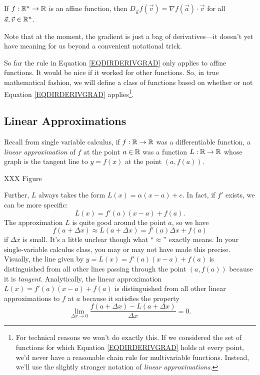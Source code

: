 \begin{theorem}
	\label{THMAFFINEDERIV}
	If $f:\mathbb{R}^n\to\mathbb{R}$ is an affine function, then
	$
		D_{\vec a}f(\vec v) = \nabla f(\vec a)\cdot \vec v
	$
	for all $\vec a,\vec v\in\mathbb{R}^n$.
\end{theorem}

Note that at the moment, the gradient is just a bag of derivatives---it
doesn't yet have meaning for us beyond a convenient notational trick.

So far the rule in Equation \eqref{EQDIRDERIVGRAD} only applies to affine functions.
It would be nice if it worked for other functions.  So, in true mathematical
fashion, we will define a class of functions based on whether or not Equation
\eqref{EQDIRDERIVGRAD} applies\footnote{ For technical reasons we won't do exactly this.
If we considered the set of functions for which Equation \eqref{EQDIRDERIVGRAD}
holds at every point, we'd never have a reasonable chain rule for multivariable
functions.  Instead, we'll use the slightly stronger notation of \emph{linear approximations}.}.

\subsection{Linear Approximations}

Recall from single variable calculus, if $f:\mathbb{R}\to\mathbb{R}$ was a differentiable function,
a \emph{linear approximation} of $f$ at the point $a\in\mathbb{R}$ was a function $L:\mathbb{R}\to\mathbb{R}$
whose graph is the tangent line to $y=f(x)$ at the point $(a,f(a))$.

XXX Figure

Further, $L$ always takes the form $L(x)=\alpha(x-a)+c$.  In fact, if $f'$ exists,
we can be more
specific:  \[L(x)=f'(a)(x-a)+f(a).\]
The approximation $L$ is quite good around the point $a$, so we have
\[
	f(a+\Delta x)\approx L(a+\Delta x) = f'(a)\Delta x+f(a)
\]
if $\Delta x$ is small.  It's a little unclear though what ``$\approx$''
exactly means.  In your single-variable calculus class, you may or may not
have made this precise.  Visually, the line given by $y=L(x)=f'(a)(x-a)+f(a)$
is distinguished from all other lines passing through the point $(a,f(a))$ because
it is \emph{tangent}.  Analytically, the linear approximation $L(x)=f'(a)(x-a)+f(a)$
is distinguished from all other linear approximations to $f$ at $a$ because it satisfies
the property
\begin{equation}
	\label{EQONEVARLINAPPROX}
	\lim_{\Delta x\to 0} \frac{f(a+\Delta x)-L(a+\Delta x)}{\Delta x} = 0.
\end{equation}

